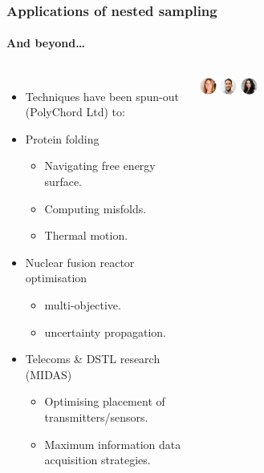 \documentclass[aspectratio=169]{beamer}
\begin{document}
\begin{frame}
    \frametitle{Applications of nested sampling}
    \framesubtitle{And beyond\ldots}
    \begin{columns}
        \begin{itemize}
            \item Techniques have been spun-out (PolyChord Ltd) to:
            \item Protein folding
                \begin{itemize}
                    \item Navigating free energy surface.
                    \item Computing misfolds.
                    \item Thermal motion.
                \end{itemize}
            \item Nuclear fusion reactor optimisation
                \begin{itemize}
                    \item multi-objective.
                    \item uncertainty propagation.
                \end{itemize}
            \item Telecoms \& DSTL research (MIDAS)
                \begin{itemize}
                    \item Optimising placement of transmitters/sensors.
                    \item Maximum information data acquisition strategies.
                \end{itemize}
        \end{itemize}
            \includegraphics[width=0.08\textwidth]{figures/headshots/catherine-watkinson.pdf}%
            \includegraphics[width=0.08\textwidth]{figures/headshots/thomas-macaloone.pdf}%
            \includegraphics[width=0.08\textwidth]{figures/headshots/parul-janagal.pdf}%

\end{columns}
\end{frame}
\end{document}
